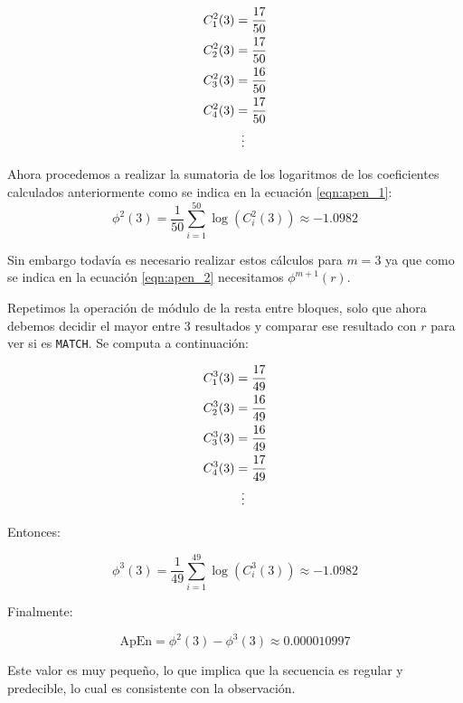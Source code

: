 \documentclass[a4paper,12pt]{article}
\begin{document}
\begin{align*}
	C_1^2(3) & =\frac{17}{50}  \\
	C_2^2(3) & =\frac{17}{50}  \\
	C_3^2(3) & =\frac{16}{50}  \\
	C_4^2(3) & =\frac{17}{50}  \\
	         & \vdotswithin{=} \\
\end{align*}

Ahora procedemos a realizar la sumatoria de los logaritmos de los coeficientes calculados anteriormente como se indica en la ecuación \ref{eqn:apen_1}:
$$\phi^2(3)=\frac{1}{50} \sum_{i=1}^{50} \log(C_i^2(3)) \approx -1.0982$$

Sin embargo todavía es necesario realizar estos cálculos para $m=3$ ya que como se indica en la ecuación \ref{eqn:apen_2} necesitamos $\phi^{m+1}(r)$. 

\clearpage

Repetimos la operación de módulo de la resta entre bloques, solo que ahora debemos decidir el mayor entre 3 resultados y comparar ese resultado con $r$ para ver si es \texttt{MATCH}. Se computa a continuación:

\begin{align*}
	C_1^3(3) & =\frac{17}{49}  \\
	C_2^3(3) & =\frac{16}{49}  \\
	C_3^3(3) & =\frac{16}{49}  \\
	C_4^3(3) & =\frac{17}{49}  \\
	         & \vdotswithin{=} \\
\end{align*}

Entonces:

$$\phi^3(3)=\frac{1}{49} \sum_{i=1}^{49} \log(C_i^3(3)) \approx -1.0982$$

Finalmente:

$$\textrm{ApEn}=\phi^2(3) - \phi^3(3) \approx 0.000010997$$

Este valor es muy pequeño, lo que implica que la secuencia es regular y predecible, lo cual es consistente con la observación.
\end{document}
